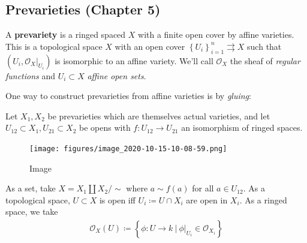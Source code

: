\hypertarget{prevarieties-chapter-5}{%
\subsection{Prevarieties (Chapter 5)}\label{prevarieties-chapter-5}}

\begin{definition}[Prevariety]

A \textbf{prevariety} is a ringed spaced \(X\) with a finite open cover
by affine varieties. This is a topological space \(X\) with an open
cover \(\left\{{U_i}\right\}_{i=1}^n \rightrightarrows X\) such that
\((U_i, { \left.{{{\mathcal{O}}_X}} \right|_{{U_i}} } )\) is isomorphic
to an affine variety. We'll call \({\mathcal{O}}_X\) the sheaf of
\emph{regular functions} and \(U_i\subset X\) \emph{affine open sets}.

\end{definition}

One way to construct prevarieties from affine varieties is by
\emph{gluing}:

\begin{definition}

Let \(X_1, X_2\) be prevarieties which are themselves actual varieties,
and let \(U_{12} \subset X_1, U_{21} \subset X_2\) be opens with
\(f: U_{12} \to U_{21}\) an isomorphism of ringed spaces.

\begin{figure}
\centering
\texttt{[image: figures/image\_2020-10-15-10-08-59.png]}
\caption{Image}
\end{figure}

As a set, take \(X = X_1 {\coprod}X_2/\sim\) where \(a\sim f(a)\) for
all \(a\in U_{12}\). As a topological space, \(U \subset X\) is open iff
\(U_i \coloneqq U\cap X_i\) are open in \(X_i\). As a ringed space, we
take
\begin{align*}
{\mathcal{O}}_X(U) \coloneqq\left\{{\phi: U\to k {~\mathrel{\Big|}~}{ \left.{{\phi}} \right|_{{U_i}} } \in {\mathcal{O}}_{X_i}}\right\}
\end{align*}

\end{definition}

